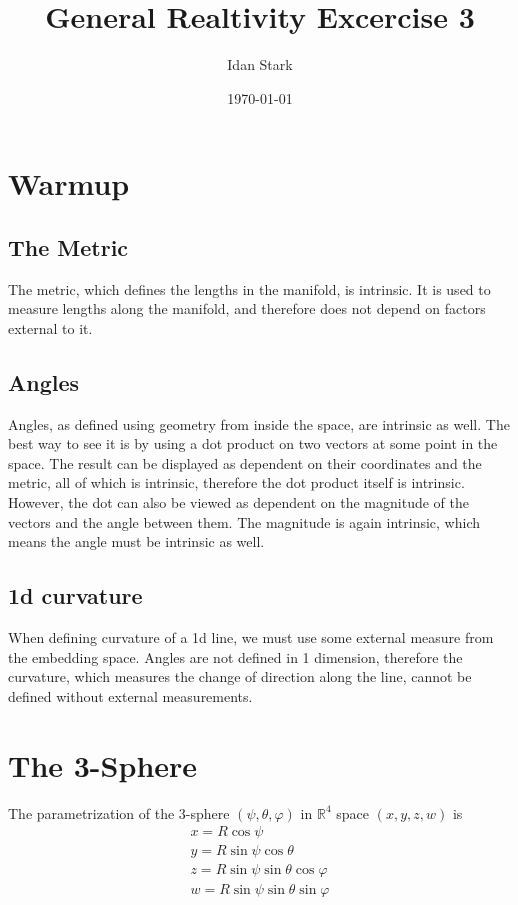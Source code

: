 \documentclass{article}
\title{General Realtivity Excercise 3}
\author{Idan Stark}
\date{\today}
\begin{document}
\maketitle

\section{Warmup}
\subsection{The Metric}
The metric, which defines the lengths in the manifold, is intrinsic. It is used to measure lengths along the manifold, and therefore does not depend on factors external to it.
\subsection{Angles}
Angles, as defined using geometry from inside the space, are intrinsic as well. The best way to see it is by using a dot product on two vectors at some point in the space. The result can be displayed as dependent on their coordinates and the metric, all of which is intrinsic, therefore the dot product itself is intrinsic. However, the dot can also be viewed as dependent on the magnitude of the vectors and the angle between them. The magnitude is again intrinsic, which means the angle must be intrinsic as well.
\subsection{1d curvature}
When defining curvature of a 1d line, we must use some external measure from the embedding space. Angles are not defined in 1 dimension, therefore the curvature, which measures the change of direction along the line, cannot be defined without external measurements. 
\section{The 3-Sphere}
The parametrization of the 3-sphere $(\psi, \theta, \varphi)$ in $\mathbb{R}^4$ space $(x, y, z, w)$ is
\begin{equation}
\begin{gathered}
    x = R\cos\psi \\
    y = R\sin\psi\cos\theta \\
    z = R\sin\psi\sin\theta\cos\varphi \\
    w = R\sin\psi\sin\theta\sin\varphi
\end{gathered}
\end{equation}
\end{document}
